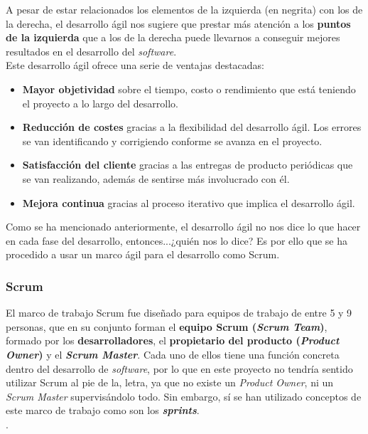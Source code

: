 A pesar de estar relacionados los elementos de la izquierda (en negrita) con los de la
derecha, el desarrollo ágil nos sugiere que prestar más atención a los \textbf{puntos
de la izquierda} que a los de la derecha puede llevarnos a conseguir mejores resultados
en el desarrollo del \textit{software}.\\

Este desarrollo ágil ofrece una serie de ventajas \cite{advantages-agile-methodology}
destacadas:

    \begin{itemize}
        \item \textbf{Mayor objetividad} sobre el tiempo, costo o rendimiento que está
        teniendo el proyecto a lo largo del desarrollo.
        \item \textbf{Reducción de costes} gracias a la flexibilidad del desarrollo ágil.
        Los errores se van identificando y corrigiendo conforme se avanza en el proyecto.
        \item \textbf{Satisfacción del cliente} gracias a las entregas de producto
        periódicas que se van realizando, además de sentirse más involucrado con él.
        \item \textbf{Mejora continua} gracias al proceso iterativo que implica el desarrollo
        ágil. 
    \end{itemize}

Como se ha mencionado anteriormente, el desarrollo ágil no nos dice lo que hacer en cada fase
del desarrollo, entonces...¿quién nos lo dice? Es por ello que se ha procedido a usar un
marco ágil para el desarrollo como Scrum.\\

\subsubsection{Scrum} \label{subsubsec:scrum}
El marco de trabajo Scrum \cite{scrum} fue diseñado para equipos de trabajo de entre 5 y 9
personas, que en su conjunto forman el \textbf{equipo Scrum (\textit{Scrum Team})}, formado por los
\textbf{desarrolladores}, el \textbf{propietario del producto (\textit{Product Owner})} y el
\textbf{\textit{Scrum Master}}. Cada uno de ellos tiene una función concreta dentro del desarrollo
de \textit{software}, por lo que en este proyecto no tendría sentido utilizar Scrum al pie
de la, letra, ya que no existe un \textit{Product Owner}, ni un \textit{Scrum Master} supervisándolo todo. Sin
embargo, sí se han utilizado conceptos de este marco de trabajo como son los \textbf{\textit{sprints}}.\\.

